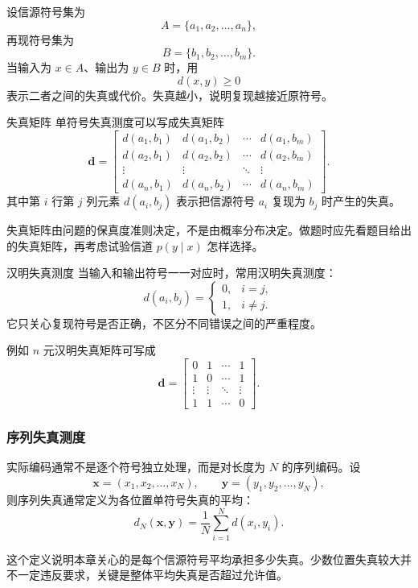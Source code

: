 设信源符号集为
\[
A=\{a_1,a_2,\dots,a_n\},
\]
再现符号集为
\[
B=\{b_1,b_2,\dots,b_m\}.
\]
当输入为 $x\in A$、输出为 $y\in B$ 时，用
\[
d(x,y)\ge0
\]
表示二者之间的失真或代价。失真越小，说明复现越接近原符号。

\begin{definitionBox}{失真矩阵}
单符号失真测度可以写成失真矩阵
\[
\mathbf d=
\begin{bmatrix}
d(a_1,b_1)&d(a_1,b_2)&\cdots&d(a_1,b_m)\\
d(a_2,b_1)&d(a_2,b_2)&\cdots&d(a_2,b_m)\\
\vdots&\vdots&\ddots&\vdots\\
d(a_n,b_1)&d(a_n,b_2)&\cdots&d(a_n,b_m)
\end{bmatrix}.
\]
其中第 $i$ 行第 $j$ 列元素 $d(a_i,b_j)$ 表示把信源符号 $a_i$ 复现为 $b_j$ 时产生的失真。
\end{definitionBox}

失真矩阵由问题的保真度准则决定，不是由概率分布决定。做题时应先看题目给出的失真矩阵，再考虑试验信道 $p(y\mid x)$ 怎样选择。

\begin{definitionBox}{汉明失真测度}
当输入和输出符号一一对应时，常用汉明失真测度：
\[
d(a_i,b_j)=
\begin{cases}
0, & i=j,\\
1, & i\ne j.
\end{cases}
\]
它只关心复现符号是否正确，不区分不同错误之间的严重程度。
\end{definitionBox}

例如 $n$ 元汉明失真矩阵可写成
\[
\mathbf d=
\begin{bmatrix}
0&1&\cdots&1\\
1&0&\cdots&1\\
\vdots&\vdots&\ddots&\vdots\\
1&1&\cdots&0
\end{bmatrix}.
\]

\subsubsection{序列失真测度}

实际编码通常不是逐个符号独立处理，而是对长度为 $N$ 的序列编码。设
\[
\mathbf x=(x_1,x_2,\dots,x_N),
\qquad
\mathbf y=(y_1,y_2,\dots,y_N),
\]
则序列失真通常定义为各位置单符号失真的平均：
\[
d_N(\mathbf x,\mathbf y)=\frac1N\sum_{i=1}^{N}d(x_i,y_i).
\]

这个定义说明本章关心的是每个信源符号平均承担多少失真。少数位置失真较大并不一定违反要求，关键是整体平均失真是否超过允许值。

